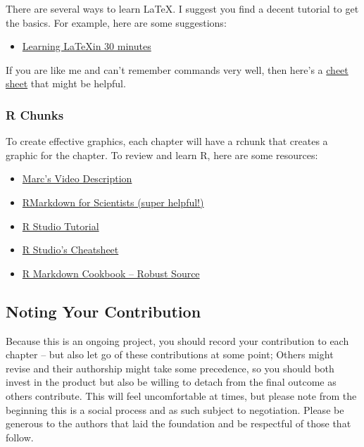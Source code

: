 \documentclass{book}\usepackage{knitr}
\begin{document}
There are several ways to learn \LaTeX. I suggest you find a decent tutorial to get the basics. For example, here are some suggestions:

\begin{itemize}
  \item \href{https://www.overleaf.com/learn/latex/Learn_LaTeX_in_30_minutes}{Learning \LaTeX in 30 minutes}
\end{itemize}

If you are like me and can't remember commands very well, then here's a \href{https://wch.github.io/latexsheet/latexsheet-0.png}{cheet sheet} that might be helpful. 

\subsubsection{R Chunks}

To create effective graphics, each chapter will have a rchunk that creates a graphic for the chapter. To review and learn R, here are some resources: 

\begin{itemize}
  \item \href{www.tbd.com}{Marc's Video Description}
  \item \href{https://rmd4sci.njtierney.com/}{RMarkdown for Scientists (super helpful!)}
  \item \href{https://rmarkdown.rstudio.com/lesson-1.html}{R Studio Tutorial}
  \item \href{https://rstudio.com/wp-content/uploads/2016/03/rmarkdown-cheatsheet-2.0.pdf?_ga=2.107420162.161662097.1613074083-214354297.1613074083}{R Studio's Cheatsheet}
  \item \href{https://bookdown.org/yihui/rmarkdown-cookbook}{R Markdown Cookbook -- Robust Source}
\end{itemize}


\subsection*{Noting Your Contribution}

Because this is an ongoing project, you should record your contribution to each chapter -- but also let go of these contributions at some point; Others might revise and their authorship might take some precedence, so you should both invest in the product but also be willing to detach from the final outcome as others contribute. This will feel uncomfortable at times, but please note from the beginning this is a social process and as such subject to negotiation. Please be generous to the authors that laid the foundation and be respectful of those that follow. 
\end{document}
